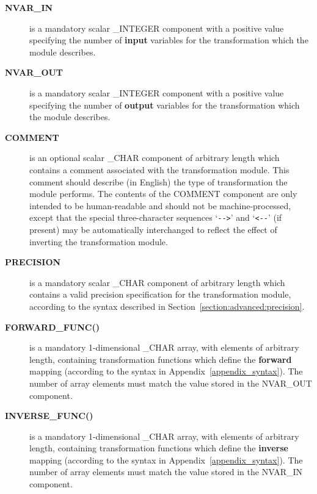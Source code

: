 \documentclass[twoside,11pt]{article}
\newcommand{\name}[1]{\mbox{\small{#1}}}
\begin{document}
\begin{description}

\item[\textbf{\name{NVAR\_IN}}] is a mandatory scalar \name{\_INTEGER}
component with a positive value specifying the number of \textbf{input}
variables for the transformation which the module describes. 

\item[\textbf{\name{NVAR\_OUT}}] is a mandatory scalar \name{\_INTEGER}
component with a positive value specifying the number of \textbf{output}
variables for the transformation which the module describes. 

\item[\textbf{\name{COMMENT}}] is an optional scalar \name{\_CHAR} component of
arbitrary length which contains a comment associated with the transformation
module.
This comment should describe (in English) the type of transformation the
module performs.
The contents of the \name{COMMENT} component are only intended to be
human-readable and should not be machine-processed, except that the special
three-character sequences `\verb#-->#' and `\verb#<--#' (if present) may be
automatically interchanged to reflect the effect of inverting the
transformation module. 

\item[\textbf{\name{PRECISION}}] is a mandatory scalar \name{\_CHAR} component
of arbitrary length which contains a valid precision specification for the 
transformation module, according to the syntax described in
Section~\ref{section:advanced:precision}. 

\item[\textbf{\name{FORWARD\_FUNC()}}] is a mandatory 1-dimensional
\name{\_CHAR} array, with elements of arbitrary length, containing
transformation functions which define the \textbf{forward} mapping (according
to the syntax in Appendix~\ref{appendix_syntax}). 
The number of array elements must match the value stored in the \name{NVAR\_OUT}
component.

\item[\textbf{\name{INVERSE\_FUNC()}}] is a mandatory 1-dimensional
\name{\_CHAR} array, with elements of arbitrary length, containing
transformation functions which define the \textbf{inverse} mapping 
(according to the syntax in Appendix~\ref{appendix_syntax}). 
The number of array elements must match the value stored in the
\name{NVAR\_IN} component. 

\end{description}
\end{document}
